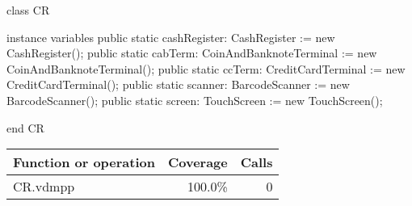 \begin{vdmpp}
class CR
 
instance variables
 public static cashRegister: CashRegister := new CashRegister(); 
  public static cabTerm: CoinAndBanknoteTerminal := new CoinAndBanknoteTerminal();
 public static ccTerm: CreditCardTerminal := new CreditCardTerminal();
 public static scanner: BarcodeScanner := new BarcodeScanner();
 public static screen: TouchScreen := new TouchScreen(); 
  
end CR
\end{vdmpp}
\bigskip
\begin{longtable}{|l|r|r|}
\hline
Function or operation & Coverage & Calls \\
\hline
\hline
\hline
CR.vdmpp & 100.0\% & 0 \\
\hline
\end{longtable}

